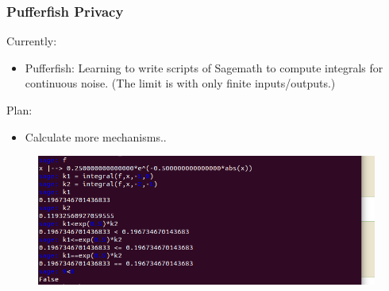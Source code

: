 \documentclass[aspectratio=1610, 13pt]{beamer}
\begin{document}
\begin{frame}\frametitle{Pufferfish Privacy}
Currently:
\begin{itemize}
  \item Pufferfish: Learning to write scripts of Sagemath to compute integrals for continuous noise. (The limit is with only finite inputs/outputs.)
\end{itemize}

Plan:
\begin{itemize}
  \item Calculate more mechanisms..
\end{itemize}
\begin{figure}[htbp]
    \includegraphics[width=0.8\linewidth]{saga.jpeg}
\end{figure}
\end{frame}
\end{document}
